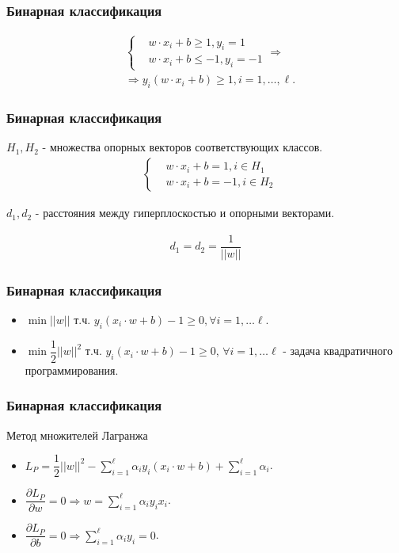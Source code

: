 \documentclass[14pt]{beamer}
\begin{document}
\begin{frame}
\frametitle{Бинарная классификация}
\begin{align*}
  &\begin{cases}
    &w \cdot x_i + b \geqslant 1, y_i = 1\\
    &w \cdot x_i + b \leqslant -1, y_i = -1
  \end{cases}\Rightarrow\\
  &\Rightarrow y_i (w \cdot x_i + b) \geqslant 1, i = 1, \ldots, \ell.
\end{align*}
\end{frame}

\begin{frame}
\frametitle{Бинарная классификация}
$H_1, H_2$ - множества опорных векторов соответствующих классов.
\begin{align*}
  &\begin{cases}
    &w \cdot x_i + b = 1, i \in H_1\\
    &w \cdot x_i + b = -1, i \in H_2
  \end{cases}
\end{align*}

$d_1, d_2$ - расстояния между гиперплоскостью и опорными векторами.

\begin{align*}
  d_1 = d_2 = \dfrac{1}{||w||}
\end{align*}
\end{frame}

\begin{frame}
\frametitle{Бинарная классификация}
\begin{itemize}
  \item<1-> $\min ||w|| \text{ т.ч. } y_i(x_i \cdot w + b) - 1 \geqslant 0, \forall i = 1, \ldots \ell$.
  \item<2-> $\min \dfrac{1}{2}||w||^2 \text{ т.ч. } y_i(x_i \cdot w + b) - 1
             \geqslant 0$, ${\forall i = 1, \ldots \ell}$ - задача
            квадратичного программирования.
\end{itemize}
\end{frame}

\begin{frame}
\frametitle{Бинарная классификация}
Метод множителей Лагранжа
\begin{itemize}
  \item<1-> $L_P = \dfrac{1}{2}||w||^2 - \sum\limits_{i = 1}^{\ell}
      \alpha_iy_i(x_i \cdot w + b) + \sum\limits_{i = 1}^{\ell}\alpha_i$.
  \item<2-> $\dfrac{\partial L_P}{\partial w} = 0 \Rightarrow
      w = \sum\limits_{i = 1}^{\ell}\alpha_iy_ix_i$.
  \item<3-> $\dfrac{\partial L_P}{\partial b} = 0 \Rightarrow
      \sum\limits_{i = 1}^{\ell}\alpha_iy_i = 0$.
\end{itemize}
\end{frame}
\end{document}
